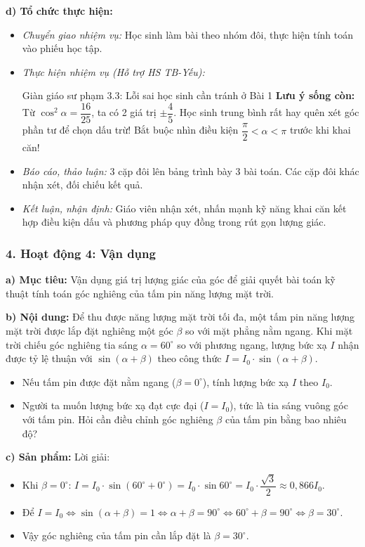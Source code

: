 \documentclass[12pt, a4paper]{article}
\begin{document}
\textbf{d) Tổ chức thực hiện:}
\begin{itemize}[leftmargin=0.6cm]
    \item \textit{Chuyển giao nhiệm vụ:} Học sinh làm bài theo nhóm đôi, thực hiện tính toán vào phiếu học tập.
    \item \textit{Thực hiện nhiệm vụ (Hỗ trợ HS TB-Yếu):}
    \begin{scaffoldbox}{Giàn giáo sư phạm 3.3: Lỗi sai học sinh cần tránh ở Bài 1}
        \textbf{Lưu ý sống còn:} Từ $\cos^2\alpha = \dfrac{16}{25}$, ta có 2 giá trị $\pm \dfrac{4}{5}$. Học sinh trung bình rất hay quên xét góc phần tư để chọn dấu trừ! Bắt buộc nhìn điều kiện $\dfrac{\pi}{2} < \alpha < \pi$ trước khi khai căn!
    \end{scaffoldbox}
    \item \textit{Báo cáo, thảo luận:} 3 cặp đôi lên bảng trình bày 3 bài toán. Các cặp đôi khác nhận xét, đối chiếu kết quả.
    \item \textit{Kết luận, nhận định:} Giáo viên nhận xét, nhấn mạnh kỹ năng khai căn kết hợp điều kiện dấu và phương pháp quy đồng trong rút gọn lượng giác.
\end{itemize}

\subsubsection*{4. Hoạt động 4: Vận dụng}
\textbf{a) Mục tiêu:} Vận dụng giá trị lượng giác của góc để giải quyết bài toán kỹ thuật tính toán góc nghiêng của tấm pin năng lượng mặt trời.

\textbf{b) Nội dung:}
Để thu được năng lượng mặt trời tối đa, một tấm pin năng lượng mặt trời được lắp đặt nghiêng một góc $\beta$ so với mặt phẳng nằm ngang. Khi mặt trời chiếu góc nghiêng tia sáng $\alpha = 60^\circ$ so với phương ngang, lượng bức xạ $I$ nhận được tỷ lệ thuận với $\sin(\alpha + \beta)$ theo công thức $I = I_0 \cdot \sin(\alpha + \beta)$.
\begin{itemize}[leftmargin=0.6cm]
    \item Nếu tấm pin được đặt nằm ngang ($\beta = 0^\circ$), tính lượng bức xạ $I$ theo $I_0$.
    \item Người ta muốn lượng bức xạ đạt cực đại ($I = I_0$), tức là tia sáng vuông góc với tấm pin. Hỏi cần điều chỉnh góc nghiêng $\beta$ của tấm pin bằng bao nhiêu độ?
\end{itemize}

\textbf{c) Sản phẩm:} Lời giải:
\begin{itemize}[leftmargin=0.6cm]
    \item Khi $\beta = 0^\circ$: $I = I_0 \cdot \sin(60^\circ + 0^\circ) = I_0 \cdot \sin 60^\circ = I_0 \cdot \dfrac{\sqrt{3}}{2} \approx 0{,}866 I_0$.
    \item Để $I = I_0 \iff \sin(\alpha + \beta) = 1 \iff \alpha + \beta = 90^\circ \iff 60^\circ + \beta = 90^\circ \iff \beta = 30^\circ$.
    \item Vậy góc nghiêng của tấm pin cần lắp đặt là $\beta = 30^\circ$.
\end{itemize}
\end{document}
